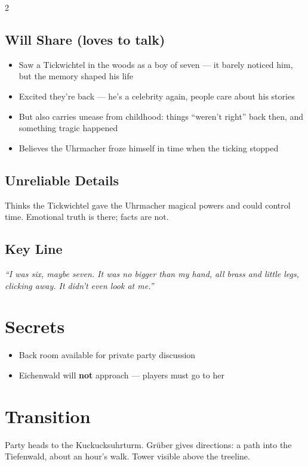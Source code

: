 \documentclass[10pt,letterpaper]{article}
\begin{document}
\begin{multicols}{2}
\subsection*{Will Share (loves to talk)}
\begin{itemize}
\item Saw a Tickwichtel in the woods as a boy of seven --- it barely noticed him, but the memory shaped his life
\item Excited they're back --- he's a celebrity again, people care about his stories
\item But also carries unease from childhood: things ``weren't right'' back then, and something tragic happened
\item Believes the Uhrmacher froze himself in time when the ticking stopped
\end{itemize}
\subsection*{Unreliable Details}
Thinks the Tickwichtel gave the Uhrmacher magical powers and could control time. Emotional truth is there; facts are not.
\subsection*{Key Line}
\textit{``I was six, maybe seven. It was no bigger than my hand, all brass and little legs, clicking away. It didn't even look at me.''}

\section*{Secrets}
\begin{itemize}
\item Back room available for private party discussion
\item Eichenwald will \textbf{not} approach --- players must go to her
\end{itemize}

\section*{Transition}
Party heads to the Kuckucksuhrturm. Grüber gives directions: a path into the Tiefenwald, about an hour's walk. Tower visible above the treeline.

\end{multicols}

\newpage

\end{document}
